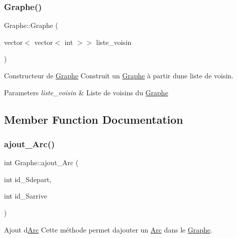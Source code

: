 \subsubsection{\texorpdfstring{Graphe()}{Graphe()}\hspace{0.1cm}{\footnotesize\ttfamily [5/5]}}
{\footnotesize\ttfamily Graphe\+::\+Graphe (\begin{DoxyParamCaption}\item[{vector$<$ vector$<$ int $>$$>$}]{liste\+\_\+voisin }\end{DoxyParamCaption})}



Constructeur de \hyperlink{classGraphe}{Graphe} Construit un \hyperlink{classGraphe}{Graphe} \`{a} partir d\textquotesingle{}une liste de voisin. 


\begin{DoxyParams}{Parameters}
{\em liste\+\_\+voisin} & Liste de voisins du \hyperlink{classGraphe}{Graphe} \\
\hline
\end{DoxyParams}


\subsection{Member Function Documentation}
\mbox{\label{classGraphe_a2e3c57c9d928066d81e880b1231a626c}} 
\subsubsection{\texorpdfstring{ajout\+\_\+\+Arc()}{ajout\_Arc()}}
{\footnotesize\ttfamily int Graphe\+::ajout\+\_\+\+Arc (\begin{DoxyParamCaption}\item[{int}]{id\+\_\+\+Sdepart,  }\item[{int}]{id\+\_\+\+Sarrive }\end{DoxyParamCaption})}



Ajout d\textquotesingle{}\hyperlink{classArc}{Arc} Cette m\'{e}thode permet d\textquotesingle{}ajouter un \hyperlink{classArc}{Arc} dans le \hyperlink{classGraphe}{Graphe}. 


